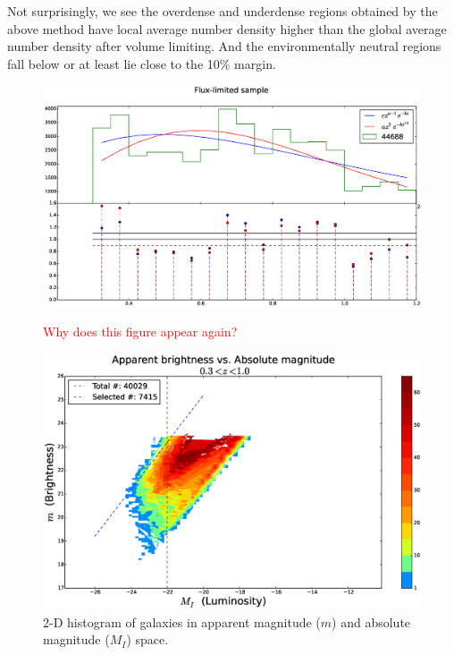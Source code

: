 \documentclass[twocolumn,useAMS,usenatbib]{mn2e}
\newcommand{\rachel}[1]{{\textcolor{red}{#1}}}
\begin{document}
Not surprisingly, we see the overdense and underdense regions obtained by the above method have local average number density higher than the global average number density after volume limiting. %
And the environmentally neutral regions fall below or at least lie close to the 10\% margin.

\begin{figure}
 \centering
  \includegraphics[width=\columnwidth]{redshift_fluxlimited}
  \label{fig:redshift_fluxlimited}
  \caption{\rachel{Why does this figure appear again?}}
\end{figure}


\begin{figure}
  \centering
   \includegraphics[width=\columnwidth]{hist2d_mag_mi}
   \caption{2-D histogram of galaxies in apparent magnitude ($m$) and absolute magnitude ($M_I$) space.}
   \label{fig:2Dhist}
 \end{figure}
  
\end{document}
